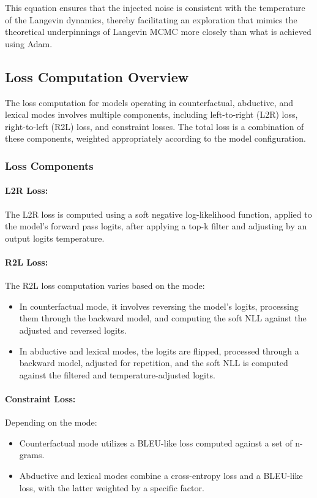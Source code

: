 \documentclass{article}
\begin{document}
This equation ensures that the injected noise is consistent with the temperature of the Langevin dynamics, thereby facilitating an exploration that mimics the theoretical underpinnings of Langevin MCMC more closely than what is achieved using Adam.

\subsection{Loss Computation Overview}

The loss computation for models operating in counterfactual, abductive, and lexical modes involves multiple components, including left-to-right (L2R) loss, right-to-left (R2L) loss, and constraint losses. The total loss is a combination of these components, weighted appropriately according to the model configuration.

\subsubsection{Loss Components}

\paragraph{L2R Loss:} The L2R loss is computed using a soft negative log-likelihood function, applied to the model's forward pass logits, after applying a top-k filter and adjusting by an output logits temperature.

\paragraph{R2L Loss:} The R2L loss computation varies based on the mode:
\begin{itemize}
    \item In counterfactual mode, it involves reversing the model's logits, processing them through the backward model, and computing the soft NLL against the adjusted and reversed logits.
    \item In abductive and lexical modes, the logits are flipped, processed through a backward model, adjusted for repetition, and the soft NLL is computed against the filtered and temperature-adjusted logits.
\end{itemize}

\paragraph{Constraint Loss:} Depending on the mode:
\begin{itemize}
    \item Counterfactual mode utilizes a BLEU-like loss computed against a set of n-grams.
    \item Abductive and lexical modes combine a cross-entropy loss and a BLEU-like loss, with the latter weighted by a specific factor.
\end{itemize}
\end{document}
